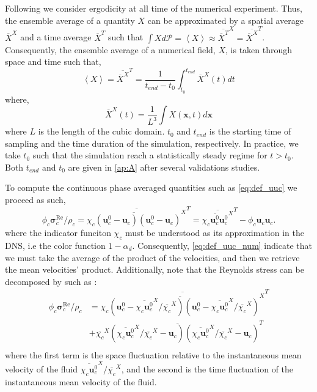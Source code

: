 \documentclass[12pt]{My_preprint}
\newcommand{\avg}[1]{\left<#1\right>}
\renewcommand{\avg}[1]{\left<#1\right>}
\newcommand{\avgcond}[1]{\overline{#1}}
\newcommand{\Tavg}[1]{\avgcond{#1}^T}
\newcommand{\Xavg}[1]{\avgcond{#1}^X}
\newcommand{\PP}{\mathscr{P}}
\renewcommand{\ref}[1]{\autoref{#1}}
\begin{document}
Following \citet{du2022analysis} we consider ergodicity at all time of the numerical experiment.
Thus, the ensemble average of a quantity $X$ can be approximated by a spatial average $\Xavg{X}$ and a time average $\Tavg{X}$ such that $\int X d\PP = \avg{X} \approx \Xavg{\Tavg{X}} = \Tavg{\Xavg{X}}$.
Consequently, the ensemble average of a numerical field, $X$, is taken through space and time such that,
\begin{equation}
    \avg{X}
    = \Tavg{\Xavg{X}}
    = \frac{1}{ t_{end} - t_0}\int_{t_0}^{t_{end}} 
    \Xavg{X}(t) dt
\end{equation}
where, 
\begin{equation}
    \Xavg{X}(t)
    = \frac{1}{L^3}\int 
    X(\textbf{x},t) d\textbf{x}
\end{equation}
where $L$ is the length of the cubic domain.
$t_0$ and $t_{end}$ is the starting time of sampling and the time duration of the simulation, respectively.
In practice, we take $t_0$ such that the simulation reach a statistically steady regime for $t>t_0$.  
Both $t_{end} $ and $t_0$ are given in \ref{ap:A} after several validations studies. 

To compute the continuous phase averaged quantities such as \ref{eq:def_uuc} we proceed as such,
\begin{equation}
    \phi_c \bm{\sigma}^{\text{Re}}_c /\rho_c
    = \Tavg{\Xavg{\chi_c (\textbf{u}_c^0 -\textbf{u}_c ) (\textbf{u}_c^0 -\textbf{u}_c)}}
    = \Tavg{\Xavg{\chi_c \textbf{u}_c^0 \textbf{u}_c^0}}
    -  \phi_c  \textbf{u}_c \textbf{u}_c.
    \label{eq:def_uuc_num} 
\end{equation}
where the indicator funciton $\chi_c$ must be understood as its approximation in the DNS, i.e the color function $1 - \alpha_d$. 
Consequently, \ref{eq:def_uuc_num} indicate that we must take the average of the product of the velocities, and then we retrieve the mean velocities' product. 
Additionally,  note that the Reynolds stress can be decomposed by such as : 
\begin{align*}
    \phi_c \bm{\sigma}^{\text{Re}}_c /\rho_c
    &= 
    \Tavg{\Xavg{\chi_c (\textbf{u}_c^0 -\Xavg{\chi_c\textbf{u}_c^0} / \Xavg{\chi_c} ) (\textbf{u}_c^0 -\Xavg{\chi_c\textbf{u}_c^0} / \Xavg{\chi_c} )}}\\
    &+ \Tavg{\Xavg{\chi_c} (\Xavg{\chi_c\textbf{u}_c^0} / \Xavg{\chi_c} - \textbf{u}_c ) (\Xavg{\chi_c\textbf{u}_c^0} / \Xavg{\chi_c} - \textbf{u}_c)}\\
\end{align*}
where the first term is the space fluctuation relative to the instantaneous mean velocity of the fluid $\Xavg{\chi_c\textbf{u}_c^0} / \Xavg{\chi_c}$, and the second is the time fluctuation of the instantaneous mean velocity of the fluid. 
\end{document}
